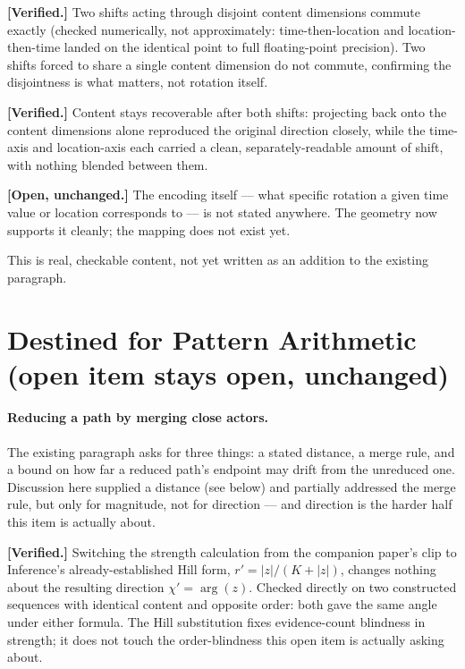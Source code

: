 \documentclass[11pt]{article}
\begin{document}
\textbf{[Verified.]} Two shifts acting through disjoint content
dimensions commute exactly (checked numerically, not approximately:
time-then-location and location-then-time landed on the identical
point to full floating-point precision). Two shifts forced to share a
single content dimension do not commute, confirming the disjointness
is what matters, not rotation itself.

\textbf{[Verified.]} Content stays recoverable after both shifts:
projecting back onto the content dimensions alone reproduced the
original direction closely, while the time-axis and location-axis
each carried a clean, separately-readable amount of shift, with
nothing blended between them.

\textbf{[Open, unchanged.]} The encoding itself --- what specific
rotation a given time value or location corresponds to --- is not
stated anywhere. The geometry now supports it cleanly; the mapping
does not exist yet.

This is real, checkable content, not yet written as an addition to
the existing paragraph.

\section{Destined for Pattern Arithmetic (open item stays open, unchanged)}

\paragraph{Reducing a path by merging close actors.} The existing
paragraph asks for three things: a stated distance, a merge rule, and
a bound on how far a reduced path's endpoint may drift from the
unreduced one. Discussion here supplied a distance (see below) and
partially addressed the merge rule, but only for magnitude, not for
direction --- and direction is the harder half this item is actually
about.

\textbf{[Verified.]} Switching the strength calculation from the
companion paper's clip to Inference's already-established Hill form,
$r'=|z|/(K+|z|)$, changes nothing about the resulting direction
$\chi'=\arg(z)$. Checked directly on two constructed sequences with
identical content and opposite order: both gave the same angle under
either formula. The Hill substitution fixes evidence-count blindness
in strength; it does not touch the order-blindness this open item is
actually asking about.
\end{document}
